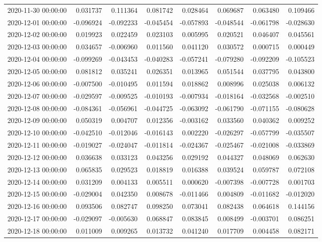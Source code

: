 \begin{tabular}{lrrrrrrr}
2020-11-30 00:00:00 & 0.031737 & 0.111364 & 0.081742 & 0.028464 & 0.069687 & 0.063480 & 0.109466 \\
2020-12-01 00:00:00 & -0.096924 & -0.092233 & -0.045454 & -0.057893 & -0.048544 & -0.061798 & -0.028630 \\
2020-12-02 00:00:00 & 0.019923 & 0.022459 & 0.023103 & 0.005995 & 0.020521 & 0.046407 & 0.045561 \\
2020-12-03 00:00:00 & 0.034657 & -0.006960 & 0.011560 & 0.041120 & 0.030572 & 0.000715 & 0.000449 \\
2020-12-04 00:00:00 & -0.099269 & -0.043453 & -0.040283 & -0.057241 & -0.079280 & -0.092209 & -0.105523 \\
2020-12-05 00:00:00 & 0.081812 & 0.035241 & 0.026351 & 0.013965 & 0.051544 & 0.037795 & 0.043800 \\
2020-12-06 00:00:00 & -0.007500 & -0.010495 & 0.011594 & 0.018862 & 0.008996 & 0.025038 & 0.006132 \\
2020-12-07 00:00:00 & -0.029597 & -0.009525 & -0.010193 & -0.007934 & -0.018164 & -0.032568 & -0.002510 \\
2020-12-08 00:00:00 & -0.084361 & -0.056961 & -0.044725 & -0.063092 & -0.061790 & -0.071155 & -0.080628 \\
2020-12-09 00:00:00 & 0.050319 & 0.004707 & 0.012356 & -0.003162 & 0.033560 & 0.040362 & 0.009252 \\
2020-12-10 00:00:00 & -0.042510 & -0.012046 & -0.016143 & 0.002220 & -0.026297 & -0.057799 & -0.035507 \\
2020-12-11 00:00:00 & -0.019027 & -0.024047 & -0.011814 & -0.024367 & -0.025467 & -0.021008 & -0.033869 \\
2020-12-12 00:00:00 & 0.036638 & 0.033123 & 0.043256 & 0.029192 & 0.044327 & 0.048069 & 0.062630 \\
2020-12-13 00:00:00 & 0.065835 & 0.029523 & 0.018819 & 0.016388 & 0.039524 & 0.059787 & 0.072108 \\
2020-12-14 00:00:00 & 0.031209 & 0.004133 & 0.005511 & 0.000620 & -0.007398 & -0.007728 & 0.001703 \\
2020-12-15 00:00:00 & -0.029004 & 0.042350 & 0.008678 & -0.011466 & 0.004809 & -0.011682 & -0.012020 \\
2020-12-16 00:00:00 & 0.093506 & 0.082747 & 0.098250 & 0.073041 & 0.082438 & 0.064618 & 0.144156 \\
2020-12-17 00:00:00 & -0.029097 & -0.005630 & 0.068847 & 0.083845 & 0.008499 & -0.003701 & 0.086251 \\
2020-12-18 00:00:00 & 0.011009 & 0.009265 & 0.013732 & 0.041240 & 0.017709 & 0.004458 & 0.082171 \\

\end{tabular}
